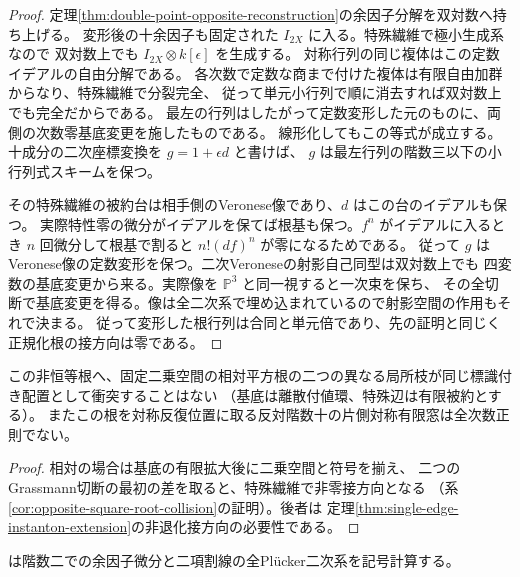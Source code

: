 \begin{proof}
定理\ref{thm:double-point-opposite-reconstruction}の余因子分解を双対数へ持ち上げる。
変形後の十余因子も固定された $I_{2X}$ に入る。特殊繊維で極小生成系なので
双対数上でも $I_{2X}\otimes k[\epsilon]$ を生成する。
対称行列の同じ複体はこの定数イデアルの自由分解である。
各次数で定数な商まで付けた複体は有限自由加群からなり、特殊繊維で分裂完全、
従って単元小行列で順に消去すれば双対数上でも完全だからである。
最左の行列はしたがって定数変形した元のものに、両側の次数零基底変更を施したものである。
線形化してもこの等式が成立する。十成分の二次座標変換を $g=1+\epsilon d$ と書けば、
$g$ は最左行列の階数三以下の小行列式スキームを保つ。

その特殊繊維の被約台は相手側のVeronese像であり、$d$ はこの台のイデアルも保つ。
実際特性零の微分がイデアルを保てば根基も保つ。$f^n$ がイデアルに入るとき
$n$ 回微分して根基で割ると $n!(df)^n$ が零になるためである。
従って $g$ はVeronese像の定数変形を保つ。二次Veroneseの射影自己同型は双対数上でも
四変数の基底変更から来る。実際像を $\mathbb P^3$ と同一視すると一次束を保ち、
その全切断で基底変更を得る。像は全二次系で埋め込まれているので射影空間の作用もそれで決まる。
従って変形した根行列は合同と単元倍であり、先の証明と同じく正規化根の接方向は零である。
\end{proof}
\begin{corollary}\label{cor:integral-root-collision-exclusion}
この非恒等根へ、固定二乗空間の相対平方根の二つの異なる局所枝が同じ標識付き配置として衝突することはない
（基底は離散付値環、特殊辺は有限被約とする）。
またこの根を対称反復位置に取る反対階数十の片側対称有限窓は全次数正則でない。
\end{corollary}
\begin{proof}
相対の場合は基底の有限拡大後に二乗空間と符号を揃え、
二つのGrassmann切断の最初の差を取ると、特殊繊維で非零接方向となる
（系\ref{cor:opposite-square-root-collision}の証明）。後者は
定理\ref{thm:single-edge-instanton-extension}の非退化接方向の必要性である。
\end{proof}
 は階数二での余因子微分と二項割線の全Plücker二次系を記号計算する。
